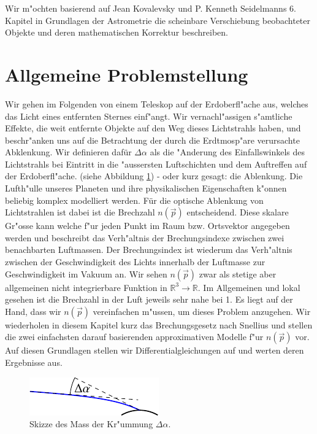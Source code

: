\begin{refsection}
Wir m"ochten basierend auf Jean Kovalevsky und P. Kenneth Seidelmanns 6. Kapitel in Grundlagen der Astrometrie \cite[p. 121ff]{licht:astrometry} die scheinbare Verschiebung beobachteter Objekte und deren mathematischen Korrektur beschreiben. 

\section{Allgemeine Problemstellung}
Wir gehen im Folgenden von einem Teleskop auf der Erdoberfl"ache aus, welches das Licht eines entfernten Sternes einf"angt. 
Wir vernachl"assigen s"amtliche Effekte, die weit entfernte Objekte auf den Weg dieses Lichtstrahls haben, und beschr"anken uns auf die Betrachtung der durch die Erdtmosp"are verursachte Abklenkung.
Wir definieren dafür $\Delta \alpha$ als die "Anderung des Einfallswinkels des Lichtstrahls bei Eintritt in die "aussersten Luftschichten und dem Auftreffen auf der Erdoberfl"ache. (siehe Abbildung \ref{fig:skizze_mass}) - oder kurz gesagt: die Ablenkung.
Die Lufth"ulle unseres Planeten und ihre physikalischen Eigenschaften k"onnen beliebig komplex modelliert werden. 
Für die optische Ablenkung von Lichtstrahlen ist dabei ist die Brechzahl $n(\vec{p})$ entscheidend. 
Diese  skalare Gr"osse kann welche f"ur jeden Punkt im Raum bzw. Ortsvektor angegeben werden und beschreibt das Verh"altnis der Brechungsindexe zwischen zwei benachbarten Luftmassen.
Der Brechungsindex ist wiederum das Verh"altnis zwischen der Geschwindigkeit des Lichts innerhalb der Luftmasse zur Geschwindigkeit im Vakuum an. 
Wir sehen $n(\vec{p})$ zwar als stetige aber allgemeinen nicht integrierbare Funktion in $ \mathbb{R}^3 \rightarrow \mathbb{R}$.
Im Allgemeinen und lokal gesehen ist die Brechzahl in der Luft jeweils sehr nahe bei 1.
Es liegt auf der Hand, dass wir $n(\vec{p})$ vereinfachen m"ussen, um dieses Problem anzugehen. 
Wir wiederholen in diesem Kapitel kurz das Brechungsgesetz nach Snellius und stellen die zwei einfachsten darauf basierenden approximativen Modelle f"ur $n(\vec{p})$ vor. 
Auf diesen Grundlagen stellen wir Differentialgleichungen auf und werten deren Ergebnisse aus.

\begin{figure}
  \centering
  \includegraphics{licht/standalone/fig_delta_alpha.pdf}
  \caption{Skizze des Mass der Kr"ummung $\Delta \alpha$. \label{fig:skizze_mass}}
\end{figure}


\end{refsection}
